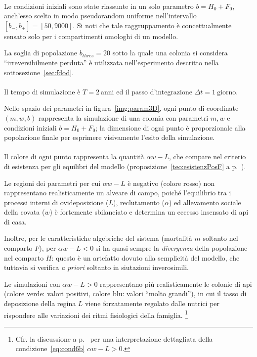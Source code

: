 \paragraph{}
Le condizioni iniziali sono state riassunte in un solo parametro $b = H_0 +F_0$, anch'esso scelto
in modo pseudorandom uniforme nell'intervallo $\left[ b_-, b_+ \right] = \left[50, 9000\right]$.
Si noti che tale raggruppamento è concettualmente sensato solo per i compartimenti omologhi di un modello.

La soglia di popolazione $b_{thres} = 20$ sotto la quale una colonia si considera ``irreversibilmente perduta''
è utilizzata nell'esperimento descritto nella sottosezione~\ref{sec:fdod}.

\paragraph{}
Il tempo di simulazione è $T=2~\text{anni}$ ed il passo d'integrazione $\Delta t = 1~\text{giorno}$.

Nello spazio dei parametri in figura~\ref{img:param3D}, ogni punto di coordinate $(m,w,b)$
rappresenta la simulazione di una colonia con parametri $m,w$ e condizioni iniziali $b=H_0+F_0$; la dimensione di ogni
punto è proporzionale alla popolazione finale per esprimere visivamente l'esito della simulazione.

\paragraph{}
\label{par:colore}
Il colore di ogni punto rappresenta la quantità $\alpha w - L$, che compare nel criterio di esistenza per gli equilibri
del modello (proposizione~\ref{teo:esistenzPosF} a p.~\pageref{teo:esistenzPosF}).

Le regioni dei parametri per cui $\alpha w -L$ è negativo (colore rosso) non rappresentano realisticamente un
alveare di campo, poiché l'equilibrio tra i processi interni di ovideposizione ($L$), reclutamento ($\alpha$) ed
allevamento sociale della covata ($w$) è fortemente sbilanciato e determina un eccesso insensato di api di casa.

Inoltre, per le caratteristiche algebriche del sistema (mortalità $m$ soltanto nel comparto $F$),
per $\alpha w -L<0$ si ha quasi sempre la \emph{divergenza} della popolazione nel comparto $H$: questo è un artefatto
dovuto alla semplicità del modello, che tuttavia si verifica \emph{a priori} soltanto in siutazioni inverosimili.

Le simulazioni con $\alpha w -L >0$ rappresentano più realisticamente le colonie di api (colore verde: valori positivi,
colore blu: valori ``molto grandi''), in cui il tasso di deposizione della regina $L$ viene forzatamente
regolato dalle nutrici per rispondere alle variazioni dei ritmi fisiologici della famiglia. %
\footnote{Cfr. la discussione a p.~\pageref{par:interpretationCond6b} per una interpretazione dettagliata
della condizione~\eqref{eq:cond6b} $\alpha w -L>0$.}

